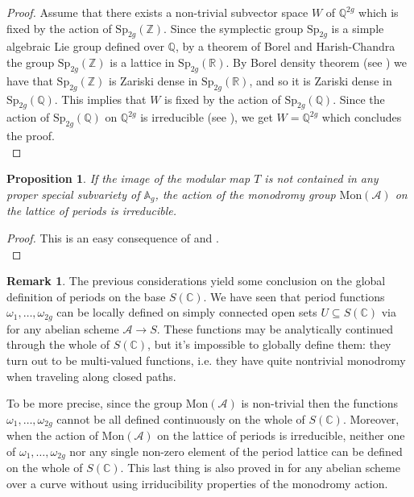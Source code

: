 \documentclass[10 pt,a4paper]{article}
\theoremstyle{plain}
\newtheorem{prop}[thm]{Proposition}
\theoremstyle{definition}
\newtheorem{rem}[thm]{Remark}
\theoremstyle{named}
\newcommand{\bA}{\mathbb A}
\newcommand{\cA}{\mathcal A}
\newcommand{\bC}{\mathbb C}
\newcommand{\bR}{\mathbb R}
\newcommand{\bQ}{\mathbb Q}
\newcommand{\bZ}{\mathbb Z}
\begin{document}
\begin{proof}
    Assume that there exists a non-trivial subvector space $W$ of $\bQ^{2g}$ which is fixed by the action of $\textrm{Sp}_{2g}(\bZ)$. Since the symplectic group $\textrm{Sp}_{2g}$ is a simple algebraic Lie group defined over $\bQ$, by a theorem of Borel and Harish-Chandra \cite[Theorem 7.8]{BorHC} the group $\textrm{Sp}_{2g}(\bZ)$ is a lattice in $\textrm{Sp}_{2g}(\bR)$. By Borel density theorem (see \cite{Bor}) we have that $\textrm{Sp}_{2g}(\bZ)$ is Zariski dense in $\textrm{Sp}_{2g}(\bR)$, and so it is Zariski dense in $\textrm{Sp}_{2g}(\bQ)$. This implies that $W$ is fixed by the action of $\textrm{Sp}_{2g}(\bQ)$. Since the action of $\textrm{Sp}_{2g}(\bQ)$ on $\bQ^{2g}$ is irreducible (see \cite[Proposition 3.2]{Gro}), we get $W=\bQ^{2g}$ which concludes the proof.\\
\end{proof}

\begin{prop}\label{irredAct}
    If the image of the modular map $T$ is not contained in any proper special subvariety of $\bA_g$, the action of the monodromy group $\textrm{Mon}(\cA)$ on the lattice of periods is irreducible.
\end{prop}

\begin{proof}
    This is an easy consequence of  and .\\
\end{proof}

\begin{rem}\label{wellDefPeriods}
    The previous considerations yield some conclusion on the global definition of periods on the base $S(\bC)$. We have seen that period functions $\omega_1, \ldots, \omega_{2g}$ can be locally defined on simply connected open sets $U \subseteq S(\bC)$ via  for any abelian scheme $\cA\rightarrow S$. These functions may be analytically continued through the whole of $S(\bC)$, but it's impossible to globally define them: they turn out to be multi-valued functions, i.e. they have quite nontrivial monodromy when traveling along closed paths. 

	To be more precise, since the group $\textrm{Mon}(\cA)$ is non-trivial then the functions $\omega_1, \ldots, \omega_{2g}$ cannot be all defined continuously on the whole of $S(\bC)$. Moreover, when the action of $\textrm{Mon}(\cA)$ on the lattice of periods is irreducible, neither one of $\omega_1, \ldots, \omega_{2g}$ nor any single non-zero element of the period lattice can be defined on the whole of $S(\bC)$. This last thing is also proved in \cite[Lemma 5.6]{GH2} for any abelian scheme over a curve without using irriducibility properties of the monodromy action.
\end{rem} 
\end{document}
